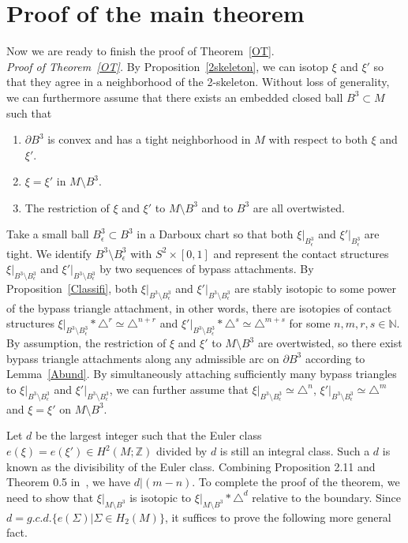 \documentclass[12pt]{amsart}
\theoremstyle{remark}
\newcommand{\bdry}{\partial}
\newcommand{\be}{\begin{enumerate}}
\newcommand{\ee}{\end{enumerate}}
\begin{document}
\section{Proof of the main theorem}

Now we are ready to finish the proof of Theorem~\ref{OT}.\\

\noindent
{\em Proof of Theorem~\ref{OT}.} By Proposition~\ref{2skeleton}, we can isotop $\xi$ and $\xi'$ so that they agree in a neighborhood of the 2-skeleton. Without loss of generality, we can furthermore assume that there exists an embedded closed ball $B^3\subset M$ such that
\be
\item{$\bdry B^3$ is convex and has a tight neighborhood in $M$ with respect to both $\xi$ and $\xi'$.}
\item{$\xi=\xi'$ in $M\setminus B^3$.}
\item{The restriction of $\xi$ and $\xi'$ to $M\setminus B^3$ and to $B^3$ are all overtwisted.}
\ee

Take a small ball $B_\epsilon^3 \subset B^3$ in a Darboux chart so that both $\xi|_{B_\epsilon^3}$ and $\xi'|_{B_\epsilon^3}$ are tight. We identify $B^3\setminus B_\epsilon^3$ with $S^2\times[0,1]$ and represent the contact structures $\xi|_{B^3\setminus B_\epsilon^3}$ and $\xi'|_{B^3\setminus B_\epsilon^3}$ by two sequences of bypass attachments. By Proposition~\ref{Classifi}, both $\xi|_{B^3\setminus B_\epsilon^3}$ and $\xi'|_{B^3\setminus B_\epsilon^3}$ are stably isotopic to some power of the bypass triangle attachment, in other words, there are isotopies of contact structures $\xi|_{B^3\setminus B_\epsilon^3}\ast\triangle^r \simeq \triangle^{n+r}$ and $\xi'|_{B^3\setminus B_\epsilon^3}\ast\triangle^s \simeq \triangle^{m+s}$ for some $n,m,r,s\in\mathbb{N}$. By assumption, the restriction of $\xi$ and $\xi'$ to $M\setminus B^3$ are overtwisted, so there exist bypass triangle attachments along any admissible arc on $\bdry B^3$ according to Lemma~\ref{Abund}. By simultaneously attaching sufficiently many bypass triangles to $\xi|_{B^3\setminus B_\epsilon^3}$ and $\xi'|_{B^3\setminus B_\epsilon^3}$, we can further assume that $\xi|_{B^3\setminus B_\epsilon^3} \simeq \triangle^n$, $\xi'|_{B^3\setminus B_\epsilon^3} \simeq \triangle^m$ and $\xi=\xi'$ on $M\setminus B^3$.

Let $d$ be the largest integer such that the Euler class $e(\xi)=e(\xi')\in H^2(M;\mathbb{Z})$ divided by $d$ is still an integral class. Such a $d$ is known as the divisibility of the Euler class. Combining Proposition 2.11 and Theorem 0.5 in~\cite{Hu}, we have $d|(m-n)$. To complete the proof of the theorem, we need to show that $\xi|_{M\setminus B^3}$ is isotopic to $\xi|_{M\setminus B^3}\ast\triangle^d$ relative to the boundary. Since $d=g.c.d.\{e(\Sigma)|\Sigma\in H_2(M)\}$, it suffices to prove the following more general fact.
\end{document}
